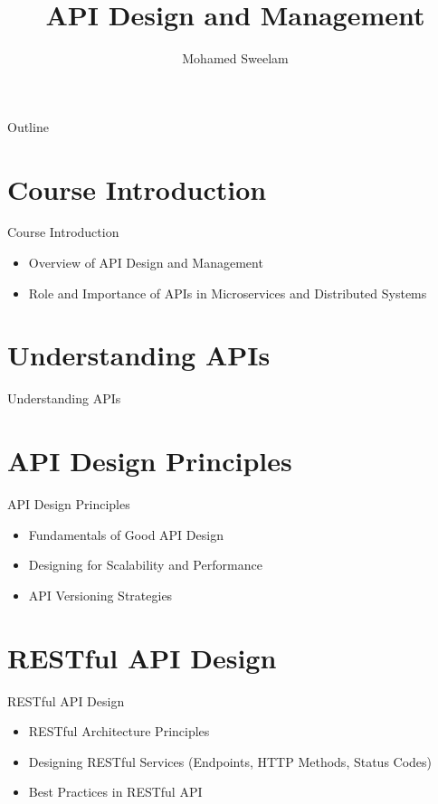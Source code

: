 \documentclass{beamer}
\title{API Design and Management}
\author{Mohamed Sweelam}
\institute{Software Engineer}
\date{}
\begin{document}
\begin{frame}
  \titlepage
\end{frame}

\begin{frame}{Outline}
  \tableofcontents
\end{frame}

\section{Course Introduction}
\begin{frame}{Course Introduction}
  \begin{itemize}
    \item Overview of API Design and Management
    \item Role and Importance of APIs in Microservices and Distributed Systems
  \end{itemize}
\end{frame}

\section{Understanding APIs}
\begin{frame}{Understanding APIs}
  \begin{center}
  \end{center}
\end{frame}

\section{API Design Principles}
\begin{frame}{API Design Principles}
  \begin{itemize}
    \item Fundamentals of Good API Design
    \item Designing for Scalability and Performance
    \item API Versioning Strategies
  \end{itemize}
\end{frame}

\section{RESTful API Design}
\begin{frame}{RESTful API Design}
  \begin{itemize}
    \item RESTful Architecture Principles
    \item Designing RESTful Services (Endpoints, HTTP Methods, Status Codes)
    \item Best Practices in RESTful API
  \end{itemize}
\end{frame}
\end{document}

